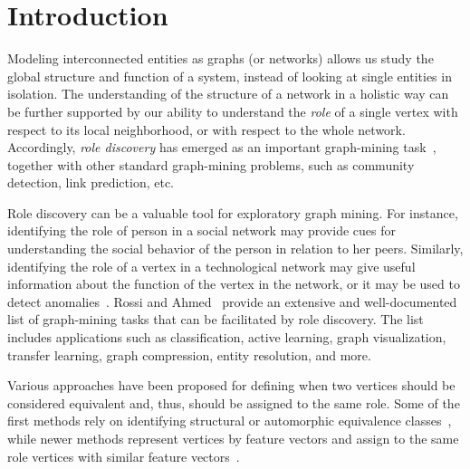 \section{Introduction}


Modeling interconnected entities as graphs (or networks)
allows us study the global structure and function of a system,
instead of looking at single entities in isolation.
The understanding of the structure of a network in a holistic way
can be further supported by our ability to 
understand the \emph{role} of a single vertex 
with respect to its local neighborhood, 
or with respect to the whole network.
Accordingly, 
\emph{role discovery} 
has emerged as an important
graph-mining task~\cite{gilpin2013guided,danilevsky2013entity,henderson2012rolx,rossi2015role,ruan2014simultaneous,yang2015network,zhao2013inferring}, 
together with other standard graph-mining problems, 
such as community detection, link prediction,  etc.

Role discovery can be a valuable tool for exploratory graph mining. 
For instance, identifying the role of person in a social network 
may provide cues for understanding the social behavior of the person
in relation to her peers. 
Similarly, identifying the role of a vertex in a technological network 
may give useful information about the function of the vertex in the network, 
or it may be used to detect anomalies~\cite{rossi2013multi}.
Rossi and Ahmed~\cite{rossi2015role}
provide an extensive and well-documented list of graph-mining tasks
that can be facilitated by role discovery. 
The list includes applications such as 
classification, active learning, graph visualization, 
transfer learning, graph compression, entity resolution, and more.


Various approaches have been proposed
for defining when two vertices should be considered equivalent and, thus,  
should be assigned to the same role. 
Some of the first methods %
rely on identifying structural or automorphic equivalence 
classes~\cite{everett1994regular,lorrain1971structural}, 
while newer methods 
represent vertices by feature vectors 
and assign to the same role vertices with similar 
feature vectors~\cite{henderson2012rolx,rossi2015role,rossi2013modeling,zhao2013inferring}.


